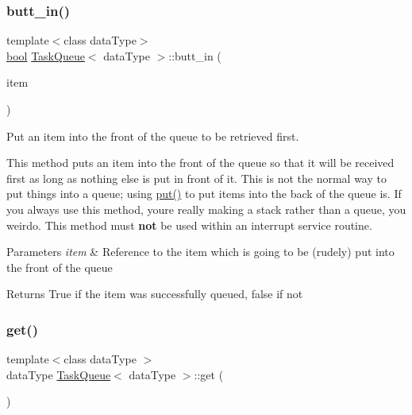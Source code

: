 \subsubsection{\texorpdfstring{butt\+\_\+in()}{butt\_in()}}
{\footnotesize\ttfamily template$<$class data\+Type$>$ \\
\mbox{\hyperlink{group___motor___boolean___type_ga0ecf26b576b9a54eca656b9be7ba6a06}{bool}} \mbox{\hyperlink{class_task_queue}{Task\+Queue}}$<$ data\+Type $>$\+::butt\+\_\+in (\begin{DoxyParamCaption}\item[{const data\+Type \&}]{item }\end{DoxyParamCaption})\hspace{0.3cm}{\ttfamily [inline]}}



Put an item into the front of the queue to be retrieved first. 

This method puts an item into the front of the queue so that it will be received first as long as nothing else is put in front of it. This is not the normal way to put things into a queue; using {\ttfamily \mbox{\hyperlink{class_task_queue_ad1dac62fcf253ab0cf50e47654c5fb29}{put()}}} to put items into the back of the queue is. If you always use this method, you\textquotesingle{}re really making a stack rather than a queue, you weirdo. This method must {\bfseries not} be used within an interrupt service routine. 
\begin{DoxyParams}{Parameters}
{\em item} & Reference to the item which is going to be (rudely) put into the front of the queue \\
\hline
\end{DoxyParams}
\begin{DoxyReturn}{Returns}
True if the item was successfully queued, false if not 
\end{DoxyReturn}
\mbox{\label{class_task_queue_a8b696b7e87f4e1bb5cfde83f91dcef75}} 
\subsubsection{\texorpdfstring{get()}{get()}}
{\footnotesize\ttfamily template$<$class data\+Type $>$ \\
data\+Type \mbox{\hyperlink{class_task_queue}{Task\+Queue}}$<$ data\+Type $>$\+::get (\begin{DoxyParamCaption}\item[{void}]{ }\end{DoxyParamCaption})\hspace{0.3cm}{\ttfamily [inline]}}



